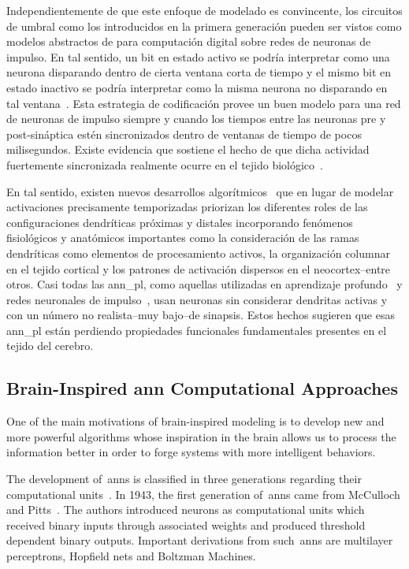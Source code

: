 {Independientemente de que este enfoque de modelado es convincente, los circuitos de umbral como los introducidos en la primera generación pueden ser vistos como modelos abstractos de para computación digital sobre redes de neuronas de impulso.
En tal sentido, un bit en estado activo se podría interpretar como una neurona disparando dentro de cierta ventana corta de tiempo y el mismo bit en estado inactivo se podría interpretar como la misma neurona no disparando en tal ventana~\cite{Valiant:1994:CM:199266}.
Esta estrategia de codificación provee un buen modelo para una red de neuronas de impulso siempre y cuando los tiempos entre las neuronas pre y post-sináptica estén sincronizados dentro de ventanas de tiempo de pocos milisegundos.
Existe evidencia que sostiene el hecho de que dicha actividad fuertemente sincronizada realmente ocurre en el tejido biológico~\cite{Abeles1993SpatiotemporalFP,bair1994}.

En tal sentido, existen nuevos desarrollos algorítmicos~\cite{10.3389/fncir.2016.00023,10.1371/journal.pone.0217966} que en lugar de modelar activaciones precisamente temporizadas priorizan los diferentes roles de las configuraciones dendríticas próximas y distales incorporando fenómenos fisiológicos y anatómicos importantes como la consideración de las ramas dendríticas como elementos de procesamiento activos, la organización columnar en el tejido cortical y los patrones de activación dispersos en el neocortex--entre otros.
Casi todas las \gls{ann_pl}, como aquellas utilizadas en aprendizaje profundo~\cite{lecun_deep_2015} y redes neuronales de impulso~\cite{MAASS19971659}, usan neuronas sin considerar dendritas activas y con un número no realista--muy bajo--de sinapsis.
Estos hechos sugieren que esas \gls{ann_pl} están perdiendo propiedades funcionales fundamentales presentes en el tejido del cerebro.
}{
\subsection{Brain-Inspired \gls{ann} Computational Approaches}

One of the main motivations of brain-inspired modeling is to develop new and more powerful algorithms whose inspiration in the brain allows us to process the information better in order to forge systems with more intelligent behaviors.

The development of~\glspl{ann} is classified in three generations regarding their computational units~\cite{MAASS19971659,10.1007/978-3-642-03156-4_17}. In 1943, the first generation of~\glspl{ann} came from McCulloch and Pitts~\cite{McCulloch1990ALC}. The authors introduced neurons as computational units which received binary inputs through associated weights and produced threshold dependent binary outputs. Important derivations from such~\glspl{ann} are multilayer perceptrons, Hopfield nets and Boltzman Machines.

}
